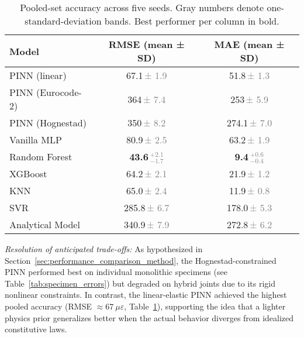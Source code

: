 \documentclass{article}
\begin{document}
\begin{table}[h]
  \centering
  \caption{Pooled-set accuracy across five seeds.  Gray numbers denote
           one-standard-deviation bands.  Best performer per column in bold.}
  \label{tab:seed_stats}
  \begin{tabular}{lcc}
    \toprule
      Model & RMSE (mean ± SD) & MAE (mean ± SD) \\[2pt]
    \midrule
      PINN (linear)         & 67.1\,\textcolor{gray}{± 1.9}   & 51.8\,\textcolor{gray}{± 1.3} \\
      PINN (Eurocode-2)     & 364\,\textcolor{gray}{± 7.4}    & 253\,\textcolor{gray}{± 5.9} \\
      PINN (Hognestad)      & 350\,\textcolor{gray}{± 8.2}    & 274.1\,\textcolor{gray}{± 7.0} \\
      Vanilla MLP           & 80.9\,\textcolor{gray}{± 2.5}   & 63.2\,\textcolor{gray}{± 1.9} \\
      Random Forest         & \textbf{43.6}\,\textcolor{gray}{\small${}^{+2.1}_{-1.7}$} & \textbf{9.4}\,\textcolor{gray}{\small${}^{+0.6}_{-0.4}$} \\
      XGBoost               & 64.2\,\textcolor{gray}{± 2.1}   & 21.9\,\textcolor{gray}{± 1.2} \\
      KNN                   & 65.0\,\textcolor{gray}{± 2.4}   & 11.9\,\textcolor{gray}{± 0.8} \\
      SVR                   & 285.8\,\textcolor{gray}{± 6.7}  & 178.0\,\textcolor{gray}{± 5.3} \\
      Analytical Model      & 340.9\,\textcolor{gray}{± 7.9}  & 272.8\,\textcolor{gray}{± 6.2} \\
    \bottomrule
  \end{tabular}
\end{table}

\emph{Resolution of anticipated trade-offs:} As hypothesized in Section~\ref{sec:performance_comparison_method}, the Hognestad-constrained PINN performed best on individual monolithic specimens (see Table~\ref{tab:specimen_errors}) but degraded on hybrid joints due to its rigid nonlinear constraints. In contrast, the linear-elastic PINN achieved the highest pooled accuracy (RMSE $\approx 67~\mu\varepsilon$, Table~\ref{tab:seed_stats}), supporting the idea that a lighter physics prior generalizes better when the actual behavior diverges from idealized constitutive laws.
\end{document}

